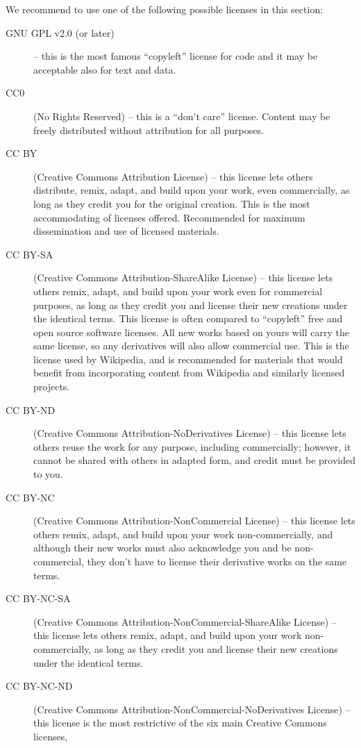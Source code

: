 We recommend to use one of the following possible licenses in this section: 
\begin{description}
  \item[GNU GPL v2.0 (or later)] -- this is the most famous ``copyleft'' license for code and it may be acceptable also for text and data.
  \item[CC0] (No Rights Reserved) -- this is a ``don't care'' license. Content may be freely distributed without attribution for all purposes. 
  \item[CC BY] (Creative Commons Attribution License) -- this license lets others distribute, remix, adapt, and build upon your work, even commercially, 
    as long as they credit you for the original creation.
    This is the most accommodating of licenses offered. Recommended for maximum dissemination and use of licensed materials.
  \item[CC BY-SA] (Creative Commons Attribution-ShareAlike License) -- this license lets others remix, adapt, and build upon your work even for commercial purposes, 
    as long as they credit you and license their new creations under the identical terms.
    This license is often compared to ``copyleft'' free and open source software licenses. 
	All new works based on yours will carry the same license, so any derivatives will also allow commercial use.
    This is the license used by Wikipedia, and is recommended for materials that would benefit from incorporating content from Wikipedia and similarly licensed projects.
  \item[CC BY-ND] (Creative Commons Attribution-NoDerivatives License) -- this license lets others reuse the work for any purpose, including commercially; 
    however, it cannot be shared with others in adapted form, and credit must be provided to you.
  \item[CC BY-NC] (Creative Commons Attribution-NonCommercial License) -- this license lets others remix, adapt, and build upon your work non-commercially, 
    and although their new works must also acknowledge you and be non-commercial, they don’t have to license their derivative works on the same terms.
  \item[CC BY-NC-SA] (Creative Commons Attribution-NonCommercial-ShareAlike License) -- this license lets others remix, adapt, and build upon your work non-commercially, 
    as long as they credit you and license their new creations under the identical terms.
  \item[CC BY-NC-ND] (Creative Commons Attribution-NonCommercial-NoDerivatives License) -- this license is the most restrictive of the six main Creative Commons licenses, 

\end{description}
